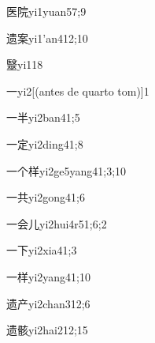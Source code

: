 \begin{verbete}{医院}{yi1yuan5}{7;9}
\end{verbete}

\begin{verbete}{遗案}{yi1'an4}{12;10}
\end{verbete}

\begin{verbete}{毉}{yi1}{18}
\end{verbete}

\begin{verbete}{一}{yi2}[(antes de quarto tom)]{1}
\end{verbete}

\begin{verbete}{一半}{yi2ban4}{1;5}
\end{verbete}

\begin{verbete}{一定}{yi2ding4}{1;8}
\end{verbete}

\begin{verbete}{一个样}{yi2ge5yang4}{1;3;10}
\end{verbete}

\begin{verbete}{一共}{yi2gong4}{1;6}
\end{verbete}

\begin{verbete}{一会儿}{yi2hui4r5}{1;6;2}
\end{verbete}

\begin{verbete}{一下}{yi2xia4}{1;3}
\end{verbete}

\begin{verbete}{一样}{yi2yang4}{1;10}
\end{verbete}

\begin{verbete}{遗产}{yi2chan3}{12;6}
\end{verbete}

\begin{verbete}{遗骸}{yi2hai2}{12;15}
\end{verbete}

